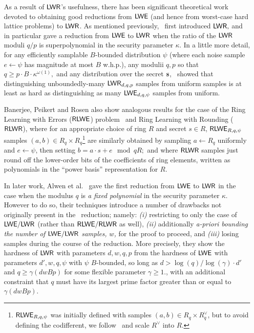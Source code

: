 As a result of $\mathsf{LWR}$'s usefulness, there has been significant
theoretical work devoted to obtaining good reductions from $\mathsf{LWE}$ (and
hence from worst-case hard lattice problems) to $\mathsf{LWR}$. As mentioned
previously,~\cite{DBLP:conf/eurocrypt/BanerjeePR12} first introduced
$\mathsf{LWR},$ and in particular gave a reduction from $\mathsf{LWE}$ to $\mathsf{LWR}$ when
the ratio of the $\mathsf{LWR}$ moduli $q/p$ is superpolynomial in the
security parameter $\kappa.$ In a little more detail, for any
efficiently samplable $B$-bounded distribution $\psi$ (where each
noise sample $e\leftarrow\psi$ has magnitude at most $B$ w.h.p.), any
modulii $q,p$ so that $q\ge p\cdot B\cdot \kappa^{\omega(1)},$ and any
distribution over the secret
$\mathbf{s}$,~\cite{DBLP:conf/eurocrypt/BanerjeePR12} showed that
distinguishing unboundedly-many $\mathsf{LWR}_{d,q,p}$ samples from uniform
samples is at least as hard as distinguishing as many
$\mathsf{LWE}_{d,q,\psi}$ samples from uniform.

Banerjee, Peikert and Rosen also show analogous results
for the case of the Ring Learning with Errors ($\mathsf{RLWE}$) problem~\cite{DBLP:journals/jacm/LyubashevskyPR13} and Ring Learning with Rounding ($\mathsf{RLWR}$),
where for an appropriate choice of ring $R$ and secret $s\in R$,
$\mathsf{RLWE}_{R,q,\psi}$ samples $(a, b)\in R_q\times R_q$\footnote{
  $\mathsf{RLWE}_{R,q,\psi}$ was initially defined with samples $(a,b) \in R_q
  \times R^{\vee}_q$, but to avoid defining the codifferent, we
  follow~\cite{DBLP:conf/crypto/Alperin-SheriffP13} and scale
  $R^{\vee}$ into $R$.} 
are similarly obtained by sampling $a\leftarrow R_q$ uniformly and $e\leftarrow\psi$, then setting $b = a\cdot s + e\mod qR;$
and where $\mathsf{RLWR}$ samples just round off the lower-order bits of the coefficients of ring elements, written as polynomials in the
``power basis'' representation for $R$.

In later work, Alwen et al.~\cite{DBLP:conf/crypto/AlwenKPW13} gave the first
reduction from $\mathsf{LWE}$ to $\mathsf{LWR}$ in the case when the modulus $q$ is \emph{a fixed polynomial}
in the security parameter $\kappa.$ However to do so, their techniques introduce a number of
drawbacks not originally present in the~\cite{DBLP:conf/eurocrypt/BanerjeePR12} reduction; namely: \emph{(i)} restricting to only
the case of $\mathsf{LWE} / \mathsf{LWR}$ (rather than $\mathsf{RLWE} / \mathsf{RLWR}$ as well), \emph{(ii)} additionally \emph{a-priori bounding
the number of $\mathsf{LWE} / \mathsf{LWR}$ samples, $w$,} for the proof to proceed, and \emph{(iii)} losing samples during the course
of the reduction. More precisely, they show the hardness of $\mathsf{LWR}$ with parameters $d, w, q, p$ from the hardness of $\mathsf{LWE}$ with
parameters $d', w, q, \psi$ with $\psi$ $B$-bounded, so long as $d > \log(q)/\log(\gamma)\cdot d'$ and $q\ge \gamma(dwBp)$
for some flexible parameter $\gamma\ge 1.$, with an additional
constraint that $q$ must have its largest prime factor
greater than or equal to $\gamma(dwBp)$. 

